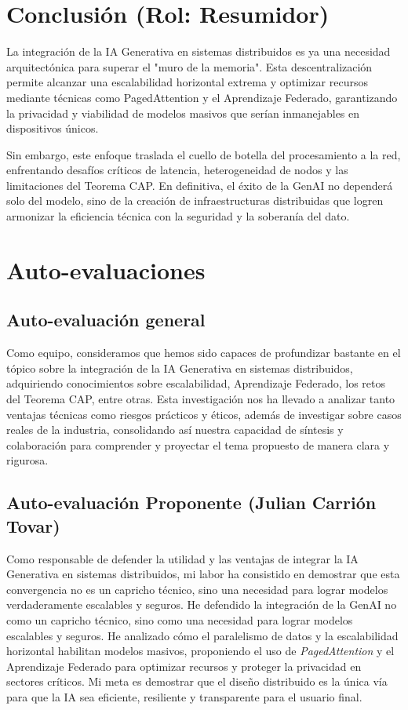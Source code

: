 \documentclass[runningheads]{llncs}
\begin{document}
\section{Conclusión (Rol: Resumidor)}
La integración de la IA Generativa en sistemas distribuidos es ya una necesidad arquitectónica para superar el "muro de la memoria". Esta descentralización permite alcanzar una escalabilidad horizontal extrema y optimizar recursos mediante técnicas como PagedAttention y el Aprendizaje Federado, garantizando la privacidad y viabilidad de modelos masivos que serían inmanejables en dispositivos únicos.

Sin embargo, este enfoque traslada el cuello de botella del procesamiento a la red, enfrentando desafíos críticos de latencia, heterogeneidad de nodos y las limitaciones del Teorema CAP. En definitiva, el éxito de la GenAI no dependerá solo del modelo, sino de la creación de infraestructuras distribuidas que logren armonizar la eficiencia técnica con la seguridad y la soberanía del dato.

\section{Auto-evaluaciones}

\subsection{Auto-evaluación general}

Como equipo, consideramos que hemos sido capaces de profundizar bastante en el tópico sobre la integración de la IA Generativa en sistemas distribuidos, adquiriendo conocimientos sobre escalabilidad, Aprendizaje Federado, los retos del Teorema CAP, entre otras. Esta investigación nos ha llevado a analizar tanto ventajas técnicas como riesgos prácticos y éticos, además de investigar sobre casos reales de la industria, consolidando así nuestra capacidad de síntesis y colaboración para comprender y proyectar el tema propuesto de manera clara y rigurosa.

\subsection{Auto-evaluación Proponente (Julian Carrión Tovar)}

Como responsable de defender la utilidad y las ventajas de integrar la IA Generativa en sistemas distribuidos, mi labor ha consistido en demostrar que esta convergencia no es un capricho técnico, sino una necesidad para lograr modelos verdaderamente escalables y seguros. He defendido la integración de la GenAI no como un capricho técnico, sino como una necesidad para lograr modelos escalables y seguros. He analizado cómo el paralelismo de datos y la escalabilidad horizontal habilitan modelos masivos, proponiendo el uso de \textit{PagedAttention} y el Aprendizaje Federado para optimizar recursos y proteger la privacidad en sectores críticos. Mi meta es demostrar que el diseño distribuido es la única vía para que la IA sea eficiente, resiliente y transparente para el usuario final.
\end{document}
